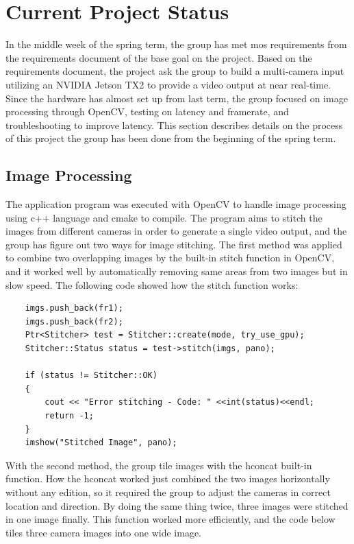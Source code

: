 \documentclass[letterpaper,10pt,serif,draftclsnofoot,onecolumn,compsoc,titlepage]{IEEEtran}
\begin{document}
\section{Current Project Status}

In the middle week of the spring term, the group has met mos requirements from the 
requirements document of the base goal on the project. Based on the requirements document,
 the project ask the group to build a multi-camera input utilizing an NVIDIA Jetson TX2 
 to provide a video output at near real-time. Since the hardware has almost set up from 
 last term, the group focused on image processing through OpenCV, testing on latency and 
 framerate, and troubleshooting to improve latency. This section describes details on the 
 process of this project the group has been done from the beginning of the spring term. \\

\subsection{Image Processing}

The application program was executed with OpenCV to handle image processing using c++ 
language and cmake to compile. The program aims to stitch the images from different cameras 
in order to generate a single video output, and the group has figure out two ways for image 
stitching. The first method was applied to combine two overlapping images by the built-in 
stitch function in OpenCV, and it worked well by automatically removing same areas from two 
images but in slow speed. The following code showed how the stitch function works: \\

\begin{lstlisting}
    imgs.push_back(fr1);
    imgs.push_back(fr2);
    Ptr<Stitcher> test = Stitcher::create(mode, try_use_gpu);
    Stitcher::Status status = test->stitch(imgs, pano);

    if (status != Stitcher::OK)
    {
        cout << "Error stitching - Code: " <<int(status)<<endl;
        return -1;
    }
    imshow("Stitched Image", pano);
\end{lstlisting}

With the second method, the group tile images with the hconcat built-in function. How the 
hconcat worked just combined the two images horizontally without any edition, so it required 
the group to adjust the cameras in correct location and direction. By doing the same thing 
twice, three images were stitched in one image finally. This function worked more efficiently, 
and the code below tiles three camera images into one wide image. \\
\end{document}
